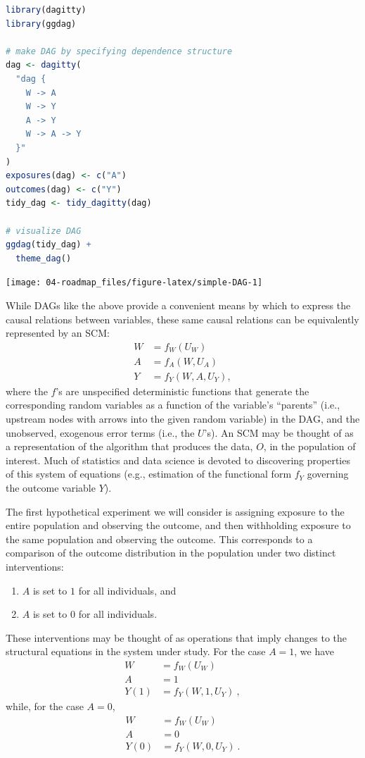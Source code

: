 \documentclass[
  12pt, krantz2,
]{krantz}
\providecommand{\tightlist}{%
  \setlength{\itemsep}{0pt}\setlength{\parskip}{0pt}}
\newcommand{\1}{\mathbbm{1}}
\theoremstyle{definition}
\theoremstyle{definition}
\theoremstyle{definition}
\theoremstyle{definition}
\theoremstyle{remark}
\begin{document}
\begin{lstlisting}[language=R]
library(dagitty)
library(ggdag)

# make DAG by specifying dependence structure
dag <- dagitty(
  "dag {
    W -> A
    W -> Y
    A -> Y
    W -> A -> Y
  }"
)
exposures(dag) <- c("A")
outcomes(dag) <- c("Y")
tidy_dag <- tidy_dagitty(dag)

# visualize DAG
ggdag(tidy_dag) +
  theme_dag()
\end{lstlisting}

\begin{center}\texttt{[image: 04-roadmap\_files/figure-latex/simple-DAG-1]} \end{center}

While DAGs like the above provide a convenient means by which to express the
causal relations between variables, these same causal relations can be
equivalently represented by an SCM:
\begin{align*}
  W &= f_W(U_W) \\
  A &= f_A(W, U_A) \\
  Y &= f_Y(W, A, U_Y),
\end{align*}
where the \(f\)'s are unspecified deterministic functions that generate the
corresponding random variables as a function of the variable's ``parents'' (i.e.,
upstream nodes with arrows into the given random variable) in the DAG, and the
unobserved, exogenous error terms (i.e., the \(U\)'s). An SCM may be thought of as
a representation of the algorithm that produces the data, \(O\), in the population
of interest. Much of statistics and data science is devoted to discovering
properties of this system of equations (e.g., estimation of the functional form
\(f_Y\) governing the outcome variable \(Y\)).

The first hypothetical experiment we will consider is assigning exposure to the
entire population and observing the outcome, and then withholding exposure to
the same population and observing the outcome. This corresponds to a comparison
of the outcome distribution in the population under two distinct interventions:

\begin{enumerate}
\def\labelenumi{\arabic{enumi}.}
\tightlist
\item
  \(A\) is set to \(1\) for all individuals, and
\item
  \(A\) is set to \(0\) for all individuals.
\end{enumerate}

These interventions may be thought of as operations that imply changes
to the structural equations in the system under study. For the case \(A = 1\), we
have
\begin{align*}
  W &= f_W(U_W) \\
  A &= 1 \\
  Y(1) &= f_Y(W, 1, U_Y) \ ,
\end{align*}
while, for the case \(A=0\),
\begin{align*}
  W &= f_W(U_W) \\
  A &= 0 \\
  Y(0) &= f_Y(W, 0, U_Y) \ .
\end{align*}
\end{document}
